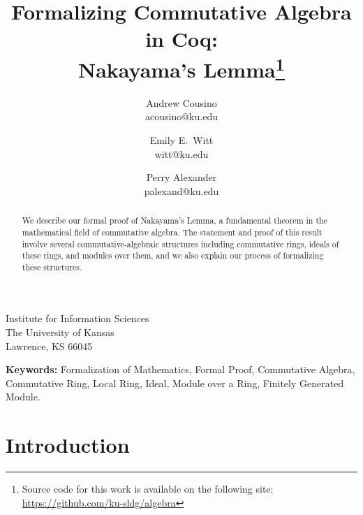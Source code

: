 \documentclass{article}
\begin{document}



\title{ 
Formalizing Commutative Algebra in Coq: \\ Nakayama's Lemma\thanks{Source code for this work is available on the following site: \url{https://github.com/ku-sldg/algebra}}
}


\date{}

\author{ 
	Andrew Cousino \\ {\ttfamily acousino@ku.edu}
	\and 
	Emily E.\ Witt \\ {\ttfamily witt@ku.edu}	
	\and 
	Perry Alexander \\ {\ttfamily palexand@ku.edu}
}	
	
\maketitle	

\vspace{-1cm}

{\large
\begin{center}
	Institute for Information Sciences \\
	The University of Kansas \\
	Lawrence, KS 66045
\end{center}
}



\begin{abstract}
We describe our formal proof of Nakayama's Lemma, a fundamental theorem in the mathematical field of commutative algebra. The statement and proof of this result involve several commutative-algebraic structures including commutative rings, ideals of these rings, and modules over them, and we also explain our process of formalizing these structures. 
\end{abstract}

\noindent \textbf{Keywords:}
Formalization of Mathematics,
Formal Proof,
Commutative Algebra,
Commutative Ring,
Local Ring,
Ideal,
Module over a Ring,
Finitely Generated Module. 


\section{Introduction}
\end{document}
